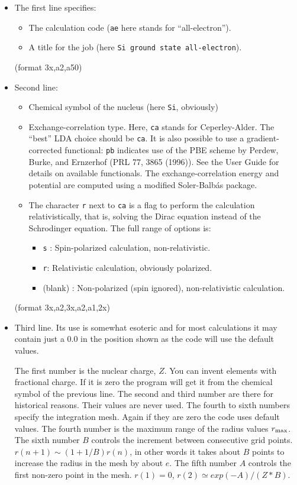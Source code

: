 \documentclass[11pt]{article}
\begin{document}
\begin{itemize}
\item The first line specifies:
	\begin{itemize}
	\item The calculation code ({\tt ae} here stands for ``all-electron'').
	\item A title for the job (here {\tt Si ground state all-electron}).
	\end{itemize}

	(format 3x,a2,a50)

\item Second line:
	\begin{itemize}

	\item Chemical symbol of the nucleus (here {\tt Si}, obviously)
	\item Exchange-correlation type. Here, {\tt ca} stands for
          Ceperley-Alder.  The
          ``best'' LDA choice should be {\tt ca}.  It is also possible
          to use a gradient-corrected functional: {\tt pb} indicates use
          of the PBE scheme by Perdew, Burke, and Ernzerhof (PRL 77,
          3865 (1996)).  See the User Guide for details on available functionals.
	  The exchange-correlation energy and potential
	  are computed using a modified Soler-Balb\'as package.

	\item The character {\tt r} next to {\tt ca} is a flag to perform the
          calculation relativistically, that is, solving the Dirac equation
          instead of the Schrodinger equation.
	  The full range of options is:
	    \begin{itemize}
		\item {\tt s} : Spin-polarized calculation, non-relativistic.
		\item {\tt r}: Relativistic calculation, obviously polarized.
		\item (blank) : Non-polarized (spin ignored), non-relativistic
           		calculation.
	    \end{itemize}
	\end{itemize}

	(format 3x,a2,3x,a2,a1,2x)

\item Third line. Its use is somewhat esoteric and for most
calculations it may contain just a 0.0 in the
position shown as the code will use the default values.

The first number is the nuclear charge, $Z$.  You can invent elements with fractional charge.
If it is zero the program will get it from the chemical symbol of the previous line.
The second and third number are there for historical reasons.  Their values are
never used.  The fourth to sixth numbers specify the integration mesh.
Again if they are zero the code uses default values.
The fourth number is the maximum range of the radius values $r_{\rm max}$.
The sixth number $B$ controls the increment between consecutive grid points.
$r(n+1) \sim (1+1/B) r(n)$, in other words it takes about $B$ points to increase the
radius in the mesh by about $e$.  The fifth number $A$ controls the first non-zero
point in the mesh. $r(1) = 0$, $r(2) \simeq exp(-A)/(Z*B)$.


\end{itemize}
\end{document}
